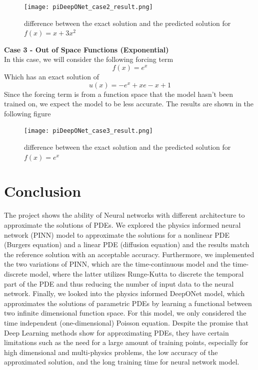 \documentclass[a4paper,12pt]{article}
\theoremstyle{definition}
\begin{document}
\begin{figure}[H]
    \centering 
    \texttt{[image: piDeepONet\_case2\_result.png]}
    \label{quadratic_f}
    \caption[figure2]{difference between the exact solution and the predicted solution for $f(x) = x + 3x^2$}
\end{figure}


\textbf{Case 3 - Out of Space Functions (Exponential)}\\
In this case, we will consider the following forcing term
\[f(x) = e^x\] 
Which has an exact solution of 
\[u(x) = - e^x +xe -x + 1\]
Since the forcing term is from a function space that the model hasn't been trained on, 
we expect the model to be less accurate. The results are shown in the following figure

\begin{figure}[H]
    \centering 
    \texttt{[image: piDeepONet\_case3\_result.png]}
    \label{exp_f}
    \caption[figure3]{difference between the exact solution and the predicted solution for $f(x) = e^x$}
\end{figure}

\section{Conclusion}
The project shows the ability of Neural networks with different architecture
to approximate the solutions of PDEs. We explored the physics informed 
neural network (PINN) model to approximate the solutions for a nonlinear 
PDE (Burgers equation) and a linear PDE (diffusion equation) and the results 
match the reference solution with an acceptable accuracy. Furthermore, we 
implemented the two variations of PINN, which are the time-continuous model and
the time-discrete model, where the latter utilizes Runge-Kutta to discrete the 
temporal part of the PDE and thus reducing the number of input data to the neural network.
Finally, we looked into the physics informed DeepONet model, which approximates the solutions 
of parametric PDEs by learning a functional between two infinite dimensional function space. 
For this model, we only considered the time independent (one-dimensional) Poisson equation.
Despite the promise that Deep Learning methods show for approximating PDEs, they have certain 
limitations such as the need for a large amount of training points, especially for high dimensional
and multi-physics problems, the low accuracy of the approximated solution, and the long training time for 
neural network model.
\end{document}
